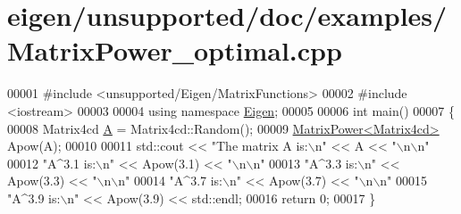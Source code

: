 \hypertarget{eigen_2unsupported_2doc_2examples_2_matrix_power__optimal_8cpp_source}{}\section{eigen/unsupported/doc/examples/\+Matrix\+Power\+\_\+optimal.cpp}
\label{eigen_2unsupported_2doc_2examples_2_matrix_power__optimal_8cpp_source}

\begin{DoxyCode}
00001 \textcolor{preprocessor}{#include <unsupported/Eigen/MatrixFunctions>}
00002 \textcolor{preprocessor}{#include <iostream>}
00003 
00004 \textcolor{keyword}{using namespace }\hyperlink{namespace_eigen}{Eigen};
00005 
00006 \textcolor{keywordtype}{int} main()
00007 \{
00008   Matrix4cd \hyperlink{group___core___module_class_eigen_1_1_matrix}{A} = Matrix4cd::Random();
00009   \hyperlink{class_eigen_1_1_matrix_power}{MatrixPower<Matrix4cd>} Apow(A);
00010 
00011   std::cout << \textcolor{stringliteral}{"The matrix A is:\(\backslash\)n"} << A << \textcolor{stringliteral}{"\(\backslash\)n\(\backslash\)n"}
00012            \textcolor{stringliteral}{"A^3.1 is:\(\backslash\)n"} << Apow(3.1) << \textcolor{stringliteral}{"\(\backslash\)n\(\backslash\)n"}
00013            \textcolor{stringliteral}{"A^3.3 is:\(\backslash\)n"} << Apow(3.3) << \textcolor{stringliteral}{"\(\backslash\)n\(\backslash\)n"}
00014            \textcolor{stringliteral}{"A^3.7 is:\(\backslash\)n"} << Apow(3.7) << \textcolor{stringliteral}{"\(\backslash\)n\(\backslash\)n"}
00015            \textcolor{stringliteral}{"A^3.9 is:\(\backslash\)n"} << Apow(3.9) << std::endl;
00016   \textcolor{keywordflow}{return} 0;
00017 \}
\end{DoxyCode}
